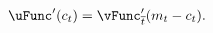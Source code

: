   \begin{equation}\begin{gathered}\begin{aligned}
        \uFunc^{\prime}({c}_{t})   & = \vEOPt^{\prime}({m}_{t}-{c}_{t}).
        \label{eq:upEqbetaOp}
      \end{aligned}\end{gathered}\end{equation}
